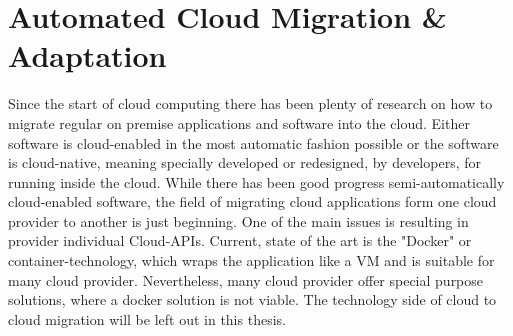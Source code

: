 \section{Automated Cloud Migration \& Adaptation}
\label{sec:RelatedWork:cloud_migration}

Since the start of cloud computing there has been plenty of research on how to migrate regular on premise applications and software into the cloud. Either software is cloud-enabled in the most automatic fashion possible or the software is cloud-native, meaning specially developed or redesigned, by developers, for running inside the cloud. While there has been good progress semi-automatically cloud-enabled software, the field of migrating cloud applications form one cloud provider to another is just beginning. One of the main issues is resulting in provider individual Cloud-APIs. Current, state of the art is the "Docker" or container-technology, which wraps the application like a VM and is suitable for many cloud provider. Nevertheless, many cloud provider offer special purpose solutions, where a docker solution is not viable. The technology side of cloud to cloud migration will be left out in this thesis. \cite{Jambunathan.February2016}\cite{Binz.2014} 